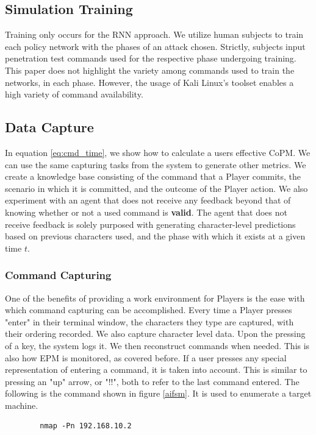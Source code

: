 \documentclass[10pt, titlepage, twocolumn]{article}
\newcommand{\ii}{\indent\indent}
\begin{document}
\subsection{Simulation Training}
\ii
Training only occurs for the RNN approach. We utilize human subjects to train each policy network with the phases of an attack chosen. Strictly, subjects input penetration test commands used for the respective phase undergoing training. This paper does not highlight the variety among commands used to train the networks, in each phase. However, the usage of Kali Linux's toolset enables a high variety of command availability.


\subsection{Data Capture}
\ii
In equation \ref{eq:cmd_time}, we show how to calculate a users effective CoPM. We can use the same capturing tasks from the system to generate other metrics. We create a knowledge base consisting of the command that a Player commits, the scenario in which it is committed, and the outcome of the Player action. We also experiment with an agent that does not receive any feedback beyond that of knowing whether or not a used command is \textbf{valid}. The agent that does not receive feedback is solely purposed with generating character-level predictions based on previous characters used, and the phase with which it exists at a given time \(t\).


\subsubsection{Command Capturing}
\ii
One of the benefits of providing a work environment for Players is the ease with which command capturing can be accomplished. Every time a Player presses "enter" in their terminal window, the characters they type are captured, with their ordering recorded. We also capture character level data. Upon the pressing of a key, the system logs it. We then reconstruct commands when needed. This is also how EPM is monitored, as covered before. If a user presses any special representation of entering a command, it is taken into account. This is similar to pressing an "up" arrow, or "!!", both to refer to the last command entered. The following is the command shown in figure \ref{aifsm}. It is used to enumerate a target machine.

\begin{verbatim}
        nmap -Pn 192.168.10.2
\end{verbatim}
\end{document}
